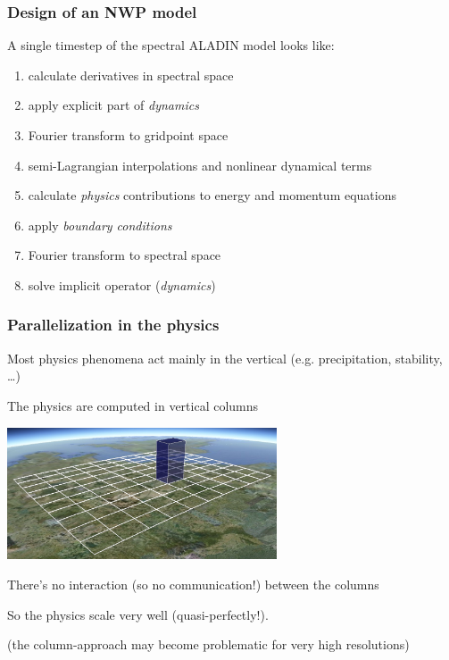 \documentclass[aspectratio=43,9pt]{beamer}
\begin{document}
%
%
\begin{frame}
	\frametitle{Design of an NWP model}
	A single timestep of the spectral ALADIN model looks like:
	\begin{enumerate}\vspace*{2ex}\setlength\itemsep{2ex}
		\item calculate derivatives in spectral space
		\item apply explicit part of \emph{dynamics}
		\item Fourier transform to gridpoint space
		\item semi-Lagrangian interpolations and nonlinear dynamical terms
		\item calculate \emph{physics} contributions to energy and momentum equations
		\item apply \emph{boundary conditions}
		\item Fourier transform to spectral space
		\item solve implicit operator (\emph{dynamics})
	\end{enumerate}	
\end{frame}
%
%
\begin{frame}
	\frametitle{Parallelization in the physics}
	\begin{myitemize}{2ex}
		\item Most physics phenomena act mainly in the vertical (e.g. precipitation, stability, \ldots)
		\item The physics are computed in vertical columns
			\begin{center}
				\includegraphics[width=8cm]{column}
			\end{center}
		\item There's no interaction (so no communication!) between the columns
		\item So the physics scale very well (quasi-perfectly!).
		\item (the column-approach may become problematic for very high resolutions)
	\end{myitemize}
\end{frame}
\end{document}
